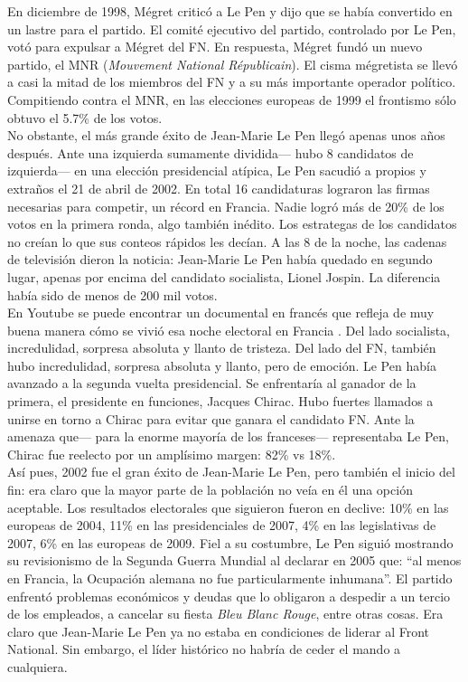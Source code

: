 En diciembre de 1998, Mégret criticó a Le Pen y dijo que se había convertido en un lastre para el partido. El comité ejecutivo del partido, controlado por Le Pen, votó para expulsar a Mégret del FN. En respuesta, Mégret fundó un nuevo partido, el MNR (\textit{Mouvement National Républicain}). El cisma mégretista se llevó a casi la mitad de los miembros del FN y a su más importante operador político. Compitiendo contra el MNR, en las elecciones europeas de 1999 el frontismo sólo obtuvo el 5.7\% de los votos.\\ 

No obstante, el más grande éxito de Jean-Marie Le Pen llegó apenas unos años después. Ante una izquierda sumamente dividida--- hubo 8 candidatos de izquierda--- en una elección presidencial atípica, Le Pen sacudió a propios y extraños el 21 de abril de 2002. En total 16 candidaturas lograron las firmas necesarias para competir, un récord en Francia. Nadie logró más de 20\% de los votos en la primera ronda, algo también inédito. Los estrategas de los candidatos no creían lo que sus conteos rápidos les decían. A las 8 de la noche, las cadenas de televisión dieron la noticia: Jean-Marie Le Pen había quedado en segundo lugar, apenas por encima del candidato socialista, Lionel Jospin. La diferencia había sido de menos de 200 mil votos.\\ 

En Youtube se puede encontrar un documental en francés que refleja de muy buena manera cómo se vivió esa noche electoral en Francia \parencite{Capo17}. Del lado socialista, incredulidad, sorpresa absoluta y llanto de tristeza. Del lado del FN, también hubo incredulidad, sorpresa absoluta y llanto, pero de emoción. Le Pen había avanzado a la segunda vuelta presidencial. Se enfrentaría al ganador de la primera, el presidente en funciones, Jacques Chirac. Hubo fuertes llamados a unirse en torno a Chirac para evitar que ganara el candidato FN. Ante la amenaza que--- para la enorme mayoría de los franceses--- representaba Le Pen, Chirac fue reelecto por un amplísimo margen: 82\% vs 18\%.\\

Así pues, 2002 fue el gran éxito de Jean-Marie Le Pen, pero también el inicio del fin: era claro que la mayor parte de la población no veía en él una opción aceptable. Los resultados electorales que siguieron fueron en declive: 10\% en las europeas de 2004, 11\% en las presidenciales de 2007, 4\% en las legislativas de 2007, 6\% en las europeas de 2009. Fiel a su costumbre, Le Pen siguió mostrando su revisionismo de la Segunda Guerra Mundial al declarar en 2005 que: ``al menos en Francia, la Ocupación alemana no fue particularmente inhumana''. El partido enfrentó problemas económicos y deudas que lo obligaron a despedir a un tercio de los empleados, a cancelar su fiesta \textit{Bleu Blanc Rouge}, entre otras cosas. Era claro que Jean-Marie Le Pen ya no estaba en condiciones de liderar al Front National. Sin embargo, el líder histórico no habría de ceder el mando a cualquiera.\\

